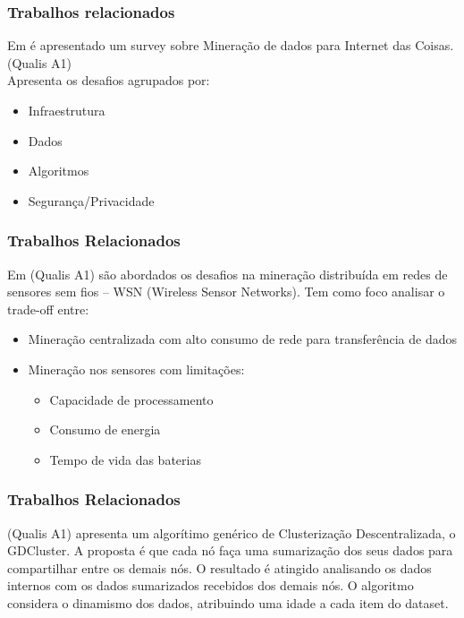 \documentclass[hyperref={pdfpagelabels=false}]{beamer}
\begin{document}
\begin{frame}
	\frametitle{Trabalhos relacionados}


    Em \cite{000-000} é apresentado um survey sobre Mineração de dados para Internet das Coisas. (Qualis A1) \\
    Apresenta os desafios agrupados por:
	\begin{itemize}
		\item Infraestrutura
        \item Dados
        \item Algoritmos
        \item Segurança/Privacidade
	\end{itemize}

\end{frame}

\begin{frame}
	\frametitle{Trabalhos Relacionados}

	Em \cite{000-014} (Qualis A1) são abordados os desafios na mineração distribuída em redes de sensores sem fios -- WSN (Wireless Sensor Networks).
    Tem como foco analisar o trade-off entre:\begin{itemize}
	    \item Mineração centralizada com alto consumo de rede para transferência de dados
        \item Mineração nos sensores com limitações: \begin{itemize}
        \item Capacidade de processamento
        \item Consumo de energia
        \item Tempo de vida das baterias
        \end{itemize}
    \end{itemize}
    
\end{frame}

\begin{frame}
	\frametitle{Trabalhos Relacionados}
	
    \cite{001-000} (Qualis A1) apresenta um algorítimo genérico de Clusterização Descentralizada, o GDCluster.
    \linebreak 
    \linebreak
    A proposta é que cada nó faça uma sumarização dos seus dados para compartilhar entre os demais nós.
    \linebreak \linebreak
    O resultado é atingido analisando os dados internos com os dados sumarizados recebidos dos demais nós.
    \linebreak \linebreak
    O algoritmo considera o dinamismo dos dados, atribuindo uma idade a cada item do dataset.
    
\end{frame}
\end{document}
